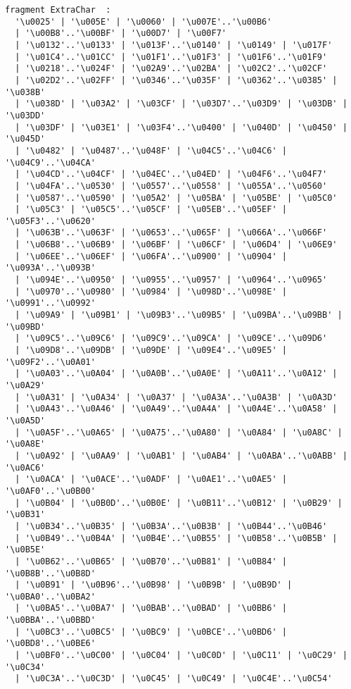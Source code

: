 \begin{verbatim}
fragment ExtraChar  : 
  '\u0025' | '\u005E' | '\u0060' | '\u007E'..'\u00B6' 
  | '\u00B8'..'\u00BF' | '\u00D7' | '\u00F7' 
  | '\u0132'..'\u0133' | '\u013F'..'\u0140' | '\u0149' | '\u017F' 
  | '\u01C4'..'\u01CC' | '\u01F1'..'\u01F3' | '\u01F6'..'\u01F9' 
  | '\u0218'..'\u024F' | '\u02A9'..'\u02BA' | '\u02C2'..'\u02CF' 
  | '\u02D2'..'\u02FF' | '\u0346'..'\u035F' | '\u0362'..'\u0385' | '\u038B' 
  | '\u038D' | '\u03A2' | '\u03CF' | '\u03D7'..'\u03D9' | '\u03DB' | '\u03DD' 
  | '\u03DF' | '\u03E1' | '\u03F4'..'\u0400' | '\u040D' | '\u0450' | '\u045D' 
  | '\u0482' | '\u0487'..'\u048F' | '\u04C5'..'\u04C6' | '\u04C9'..'\u04CA' 
  | '\u04CD'..'\u04CF' | '\u04EC'..'\u04ED' | '\u04F6'..'\u04F7' 
  | '\u04FA'..'\u0530' | '\u0557'..'\u0558' | '\u055A'..'\u0560' 
  | '\u0587'..'\u0590' | '\u05A2' | '\u05BA' | '\u05BE' | '\u05C0' 
  | '\u05C3' | '\u05C5'..'\u05CF' | '\u05EB'..'\u05EF' | '\u05F3'..'\u0620' 
  | '\u063B'..'\u063F' | '\u0653'..'\u065F' | '\u066A'..'\u066F' 
  | '\u06B8'..'\u06B9' | '\u06BF' | '\u06CF' | '\u06D4' | '\u06E9' 
  | '\u06EE'..'\u06EF' | '\u06FA'..'\u0900' | '\u0904' | '\u093A'..'\u093B' 
  | '\u094E'..'\u0950' | '\u0955'..'\u0957' | '\u0964'..'\u0965' 
  | '\u0970'..'\u0980' | '\u0984' | '\u098D'..'\u098E' | '\u0991'..'\u0992' 
  | '\u09A9' | '\u09B1' | '\u09B3'..'\u09B5' | '\u09BA'..'\u09BB' | '\u09BD' 
  | '\u09C5'..'\u09C6' | '\u09C9'..'\u09CA' | '\u09CE'..'\u09D6' 
  | '\u09D8'..'\u09DB' | '\u09DE' | '\u09E4'..'\u09E5' | '\u09F2'..'\u0A01' 
  | '\u0A03'..'\u0A04' | '\u0A0B'..'\u0A0E' | '\u0A11'..'\u0A12' | '\u0A29' 
  | '\u0A31' | '\u0A34' | '\u0A37' | '\u0A3A'..'\u0A3B' | '\u0A3D' 
  | '\u0A43'..'\u0A46' | '\u0A49'..'\u0A4A' | '\u0A4E'..'\u0A58' | '\u0A5D' 
  | '\u0A5F'..'\u0A65' | '\u0A75'..'\u0A80' | '\u0A84' | '\u0A8C' | '\u0A8E' 
  | '\u0A92' | '\u0AA9' | '\u0AB1' | '\u0AB4' | '\u0ABA'..'\u0ABB' | '\u0AC6' 
  | '\u0ACA' | '\u0ACE'..'\u0ADF' | '\u0AE1'..'\u0AE5' | '\u0AF0'..'\u0B00' 
  | '\u0B04' | '\u0B0D'..'\u0B0E' | '\u0B11'..'\u0B12' | '\u0B29' | '\u0B31' 
  | '\u0B34'..'\u0B35' | '\u0B3A'..'\u0B3B' | '\u0B44'..'\u0B46' 
  | '\u0B49'..'\u0B4A' | '\u0B4E'..'\u0B55' | '\u0B58'..'\u0B5B' | '\u0B5E' 
  | '\u0B62'..'\u0B65' | '\u0B70'..'\u0B81' | '\u0B84' | '\u0B8B'..'\u0B8D' 
  | '\u0B91' | '\u0B96'..'\u0B98' | '\u0B9B' | '\u0B9D' | '\u0BA0'..'\u0BA2' 
  | '\u0BA5'..'\u0BA7' | '\u0BAB'..'\u0BAD' | '\u0BB6' | '\u0BBA'..'\u0BBD' 
  | '\u0BC3'..'\u0BC5' | '\u0BC9' | '\u0BCE'..'\u0BD6' | '\u0BD8'..'\u0BE6' 
  | '\u0BF0'..'\u0C00' | '\u0C04' | '\u0C0D' | '\u0C11' | '\u0C29' | '\u0C34' 
  | '\u0C3A'..'\u0C3D' | '\u0C45' | '\u0C49' | '\u0C4E'..'\u0C54' 

\end{verbatim}
